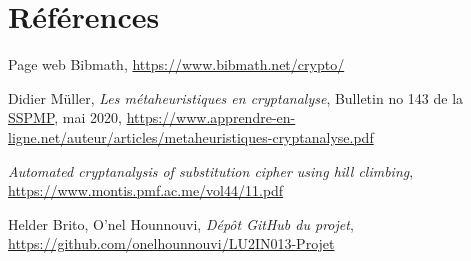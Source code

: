 \documentclass[a4paper]{article}
\begin{document}
\label{sec:annexes}
\section*{Références}

\begin{enumerate}[label={[\arabic*]}]
    \item Page web Bibmath, \url{https://www.bibmath.net/crypto/}
    \item Didier Müller, \textit{Les métaheuristiques en cryptanalyse},  Bulletin no 143 de la \href{https://www.vsmp.ch/}{SSPMP}, mai 2020, \url{https://www.apprendre-en-ligne.net/auteur/articles/metaheuristiques-cryptanalyse.pdf}
    \item \textit{Automated cryptanalysis of substitution cipher using hill climbing}, \url{https://www.montis.pmf.ac.me/vol44/11.pdf}
    \item Helder Brito, O'nel Hounnouvi, \textit{Dépôt GitHub du projet}, \url{https://github.com/onelhounnouvi/LU2IN013-Projet}
\end{enumerate}
\end{document}
